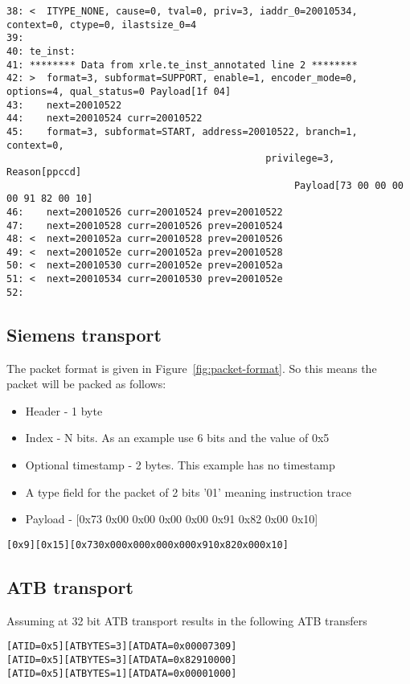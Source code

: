 \begin{lstlisting}[basicstyle=\tiny]
38: <  ITYPE_NONE, cause=0, tval=0, priv=3, iaddr_0=20010534, context=0, ctype=0, ilastsize_0=4
39:
40: te_inst:
41: ******** Data from xrle.te_inst_annotated line 2 ********
42: >  format=3, subformat=SUPPORT, enable=1, encoder_mode=0, options=4, qual_status=0 Payload[1f 04]
43:    next=20010522
44:    next=20010524 curr=20010522
45:    format=3, subformat=START, address=20010522, branch=1, context=0,
                                             privilege=3, Reason[ppccd]
                                                  Payload[73 00 00 00 00 91 82 00 10]
46:    next=20010526 curr=20010524 prev=20010522
47:    next=20010528 curr=20010526 prev=20010524
48: <  next=2001052a curr=20010528 prev=20010526
49: <  next=2001052e curr=2001052a prev=20010528
50: <  next=20010530 curr=2001052e prev=2001052a
51: <  next=20010534 curr=20010530 prev=2001052e
52:
\end{lstlisting}

\subsection{Siemens transport}

The packet format is given in Figure~\ref{fig:packet-format}. So this means the packet will be packed as follows:

\begin{itemize}
\item
  Header - 1 byte
\item
  Index - N bits. As an example use 6 bits and the value of 0x5
\item
  Optional timestamp - 2 bytes. This example has no timestamp
\item
A type field for the packet of 2 bits '01' meaning instruction trace  
\item
  Payload - [0x73 0x00 0x00 0x00 0x00 0x91 0x82 0x00 0x10]
\end{itemize}

\begin {alltt}
  [0x9][0x15][0x73 0x00 0x00 0x00 0x00 0x91 0x82 0x00 0x10]
\end{alltt}
\subsection{ATB transport}

Assuming at 32 bit ATB transport results in the following ATB transfers

\begin {alltt}
[ATID=0x5] [ATBYTES = 3] [ATDATA = 0x00007309]
[ATID=0x5] [ATBYTES = 3] [ATDATA = 0x82910000]
[ATID=0x5] [ATBYTES = 1] [ATDATA = 0x00001000]
\end{alltt}
